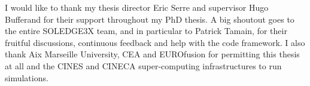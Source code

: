 
I would like to thank my thesis director Eric Serre and supervisor Hugo Bufferand for their support throughout my PhD thesis. A big shoutout goes to the entire SOLEDGE3X team, and in particular to Patrick Tamain, for their fruitful discussions, continuous feedback and help with the code framework. I also thank Aix Marseille University, CEA and EUROfusion for permitting this thesis at all and the CINES and CINECA super-computing infrastructures to run simulations.